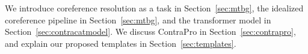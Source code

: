 We introduce coreference resolution as a task in Section~\ref{sec:mtbg}, the idealized coreference pipeline in Section~\ref{sec:mtbg}, and the transformer model in Section~\ref{sec:contracatmodel}.  
We discuss ContraPro in Section~\ref{sec:contrapro}, and explain our proposed templates in Section~\ref{sec:templates}.


